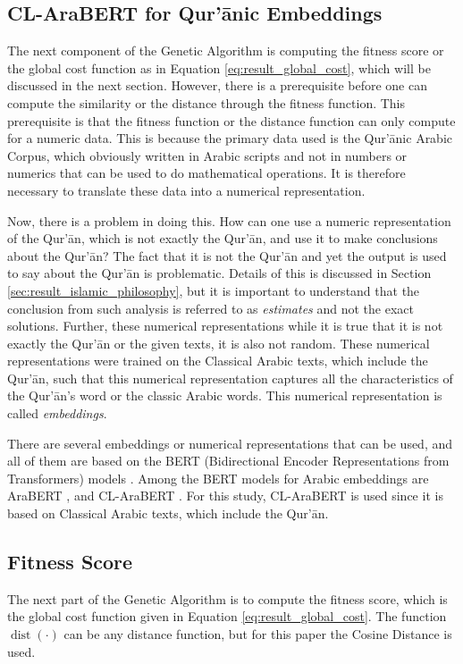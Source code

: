 \subsection{CL-AraBERT for Qur'\=anic Embeddings}
The next component of the Genetic Algorithm is computing the fitness score or the global cost function as in Equation \ref{eq:result_global_cost}, which will be discussed in the next section. However, there is a prerequisite before one can compute the similarity or the distance through the fitness function. This prerequisite is that the fitness function or the distance function can only compute for a numeric data. This is because the primary data used is the Qur'\=anic Arabic Corpus, which obviously written in Arabic scripts and not in numbers or numerics that can be used to do mathematical operations. It is therefore necessary to translate these data into a numerical representation. 

Now, there is a problem in doing this. How can one use a numeric representation of the Qur'\=an, which is not exactly the Qur'\=an, and use it to make conclusions about the Qur'\=an? The fact that it is not the Qur'\=an and yet the output is used to say about the Qur'\=an is problematic. Details of this is discussed in Section \ref{sec:result_islamic_philosophy}, but it is important to understand that the conclusion from such analysis is referred to as \textit{estimates} and not the exact solutions. Further, these numerical representations while it is true that it is not exactly the Qur'\=an or the given texts, it is also not random. These numerical representations were trained on the Classical Arabic texts, which include the Qur'\=an, such that this numerical representation captures all the characteristics of the Qur'\=an's word or the classic Arabic words. This numerical representation is called \textit{embeddings}.

There are several embeddings or numerical representations that can be used, and all of them are based on the BERT (Bidirectional Encoder Representations from Transformers) models \cite{devlin2018bert}. Among the BERT models for Arabic embeddings are AraBERT \cite{mahboub2024evaluation}, and CL-AraBERT \cite{MALHAS2022103068}. For this study, CL-AraBERT is used since it is based on Classical Arabic texts, which include the Qur'\=an.
\subsection{Fitness Score}
The next part of the Genetic Algorithm is to compute the fitness score, which is the global cost function given in Equation \ref{eq:result_global_cost}. The function $\operatorname{dist}(\cdot)$ can be any distance function, but for this paper the Cosine Distance is used.
